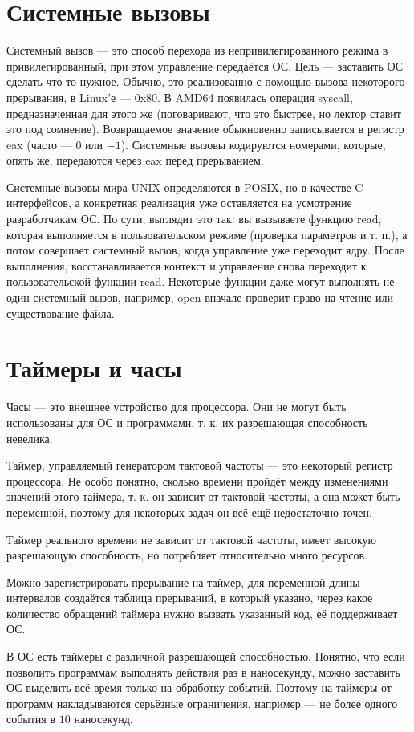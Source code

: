 \documentclass[main]{subfiles}
\begin{document}
\section{Системные вызовы}
Системный вызов --- это способ перехода из непривилегированного режима в
привилегированный, при этом управление передаётся ОС. Цель --- заставить ОС
сделать что-то нужное. Обычно, это реализованно с помощью вызова некоторого
прерывания, в Linux'е --- 0x80. В AMD64 появилась операция syscall, предназначенная
для этого же (поговаривают, что это быстрее, но лектор ставит это под сомнение).
Возвращаемое значение обыкновенно записывается в регистр eax (часто --- $0$ или $-1$).
Системные вызовы кодируются номерами, которые, опять же, передаются через eax
перед прерыванием.

Системные вызовы мира UNIX определяются в POSIX, но в качестве C-интерфейсов, а
конкретная реализация уже оставляется на усмотрение разработчикам ОС.
По сути, выглядит это так: вы вызываете функцию read, которая выполняется
в пользовательском режиме (проверка параметров и т. п.), а потом совершает
системный вызов, когда управление уже переходит ядру. После выполнения,
восстанавливается контекст и управление снова переходит к пользовательской
функции read. Некоторые функции даже могут выполнять не один системный вызов,
например, open вначале проверит право на чтение или существование файла.

\section{Таймеры и часы}
Часы --- это внешнее устройство для процессора. Они не могут быть использованы
для ОС и программами, т. к. их разрешающая способность невелика.

Таймер, управляемый генератором тактовой частоты --- это некоторый регистр
процессора. Не особо понятно, сколько времени пройдёт между изменениями
значений этого таймера, т. к. он зависит от тактовой частоты, а она может
быть переменной, поэтому для некоторых задач он всё ещё недостаточно
точен.

Таймер реального времени не зависит от тактовой частоты, имеет высокую
разрешающую способность, но потребляет относительно много ресурсов.

Можно зарегистрировать прерывание на таймер, для переменной длины интервалов
создаётся таблица прерываний, в который указано, через какое количество
обращений таймера нужно вызвать указанный код, её поддерживает ОС.

В ОС есть таймеры с различной разрешающей способностью. Понятно, что если
позволить программам выполнять действия раз в наносекунду, можно заставить
ОС выделить всё время только на обработку событий. Поэтому на таймеры от
программ накладываются серьёзные ограничения, например --- не более одного
события в $10$ наносекунд.
\end{document}
